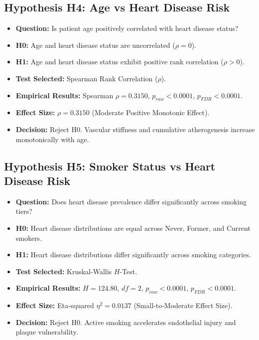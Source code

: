 \subsection{Hypothesis H4: Age vs Heart Disease Risk}
\begin{itemize}
    \item \textbf{Question:} Is patient age positively correlated with heart disease status?
    \item \textbf{H0:} Age and heart disease status are uncorrelated ($\rho = 0$).
    \item \textbf{H1:} Age and heart disease status exhibit positive rank correlation ($\rho > 0$).
    \item \textbf{Test Selected:} Spearman Rank Correlation ($\rho$).
    \item \textbf{Empirical Results:} Spearman $\rho = 0.3150$, $p_{raw} < 0.0001$, $p_{FDR} < 0.0001$.
    \item \textbf{Effect Size:} $\rho = 0.3150$ (Moderate Positive Monotonic Effect).
    \item \textbf{Decision:} Reject H0. Vascular stiffness and cumulative atherogenesis increase monotonically with age.
\end{itemize}

\subsection{Hypothesis H5: Smoker Status vs Heart Disease Risk}
\begin{itemize}
    \item \textbf{Question:} Does heart disease prevalence differ significantly across smoking tiers?
    \item \textbf{H0:} Heart disease distributions are equal across Never, Former, and Current smokers.
    \item \textbf{H1:} Heart disease distributions differ significantly across smoking categories.
    \item \textbf{Test Selected:} Kruskal-Wallis $H$-Test.
    \item \textbf{Empirical Results:} $H = 124.80$, $df = 2$, $p_{raw} < 0.0001$, $p_{FDR} < 0.0001$.
    \item \textbf{Effect Size:} Eta-squared $\eta^2 = 0.0137$ (Small-to-Moderate Effect Size).
    \item \textbf{Decision:} Reject H0. Active smoking accelerates endothelial injury and plaque vulnerability.
\end{itemize}

